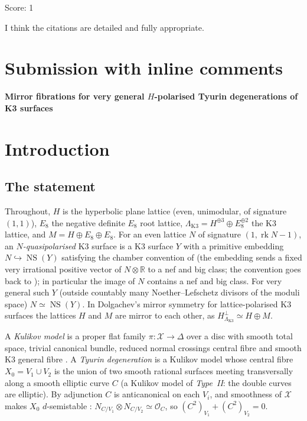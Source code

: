 \documentclass[11pt]{article}
\newcommand{\NS}{\operatorname{NS}}
\newcommand{\rk}{\operatorname{rk}}
\newcommand{\calX}{\mathcal X}
\newcommand{\LK}{\Lambda_{\mathrm{K3}}}
\theoremstyle{definition}
\theoremstyle{remark}
\begin{document}
\noindent Score: 1

I think the citations are detailed and fully appropriate.

\newpage
\section{Submission with inline comments}


\begin{center}
\textbf{Mirror fibrations for very general \(H\)-polarised Tyurin
degenerations of K3 surfaces}
\end{center}

\section{Introduction}

\subsection{The statement}

Throughout, \(H\) is the hyperbolic plane lattice (even, unimodular,
of signature \((1,1)\)), \(E_8\) the negative definite \(E_8\) root
lattice, \(\LK=H^{\oplus3}\oplus E_8^{\oplus2}\) the K3 lattice, and
\(M=H\oplus E_8\oplus E_8\). For an even lattice \(N\) of signature
\((1,\rk N-1)\), an \emph{\(N\)-quasipolarised} K3 surface is a K3
surface \(Y\) with a primitive embedding \(N\hookrightarrow\NS(Y)\)
satisfying the chamber convention of \cite[Definition~3.19]{GT} (the
embedding sends a fixed very irrational positive vector of
\(N\otimes\mathbb R\) to a nef and big class; the convention goes back
to \cite{Do}); in particular the image of \(N\) contains a nef and big
class. 
For very general such \(Y\) (outside countably
many Noether--Lefschetz divisors of the moduli space)
\(N\simeq\NS(Y)\). In Dolgachev's mirror symmetry for
lattice-polarised K3 surfaces \cite{Do} the lattices \(H\) and \(M\)
are mirror to each other, as \(H^\perp_{\LK}\simeq H\oplus M\).

A \emph{Kulikov model} is a proper flat family
\(\pi\colon\calX\to\Delta\) over a disc with smooth total space,
trivial canonical bundle, reduced normal crossings central fibre and
smooth K3 general fibre \cite{Ku}. A \emph{Tyurin degeneration} is a
Kulikov model whose central fibre \(X_0=V_1\cup V_2\) is the union of
two smooth rational surfaces meeting transversally along a smooth
elliptic curve \(C\) (a Kulikov model of \emph{Type~II}: the double
curves are elliptic). By adjunction \(C\) is anticanonical on each
\(V_i\), and smoothness of \(\calX\) makes \(X_0\) \(d\)-semistable
\cite{Fr83}: \(N_{C/V_1}\otimes N_{C/V_2}\simeq\mathcal O_C\), so
\((C^2)_{V_1}+(C^2)_{V_2}=0\).
\end{document}
